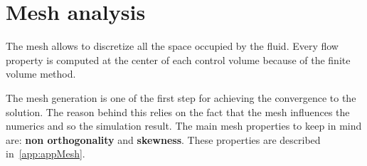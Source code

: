 
\section{Mesh analysis}

\setcounter{page}{1}

    The mesh allows to discretize all the space occupied by the fluid. Every flow property is computed at the center of each control volume because of the finite volume method.

    The mesh generation is one of the first step for achieving the convergence to the solution. The reason behind this relies on the fact that the mesh influences the numerics and so the simulation result. The main mesh properties to keep in mind are: \textbf{non orthogonality} and \textbf{skewness}. These properties are described in~\ref{app:appMesh}.  


%    


